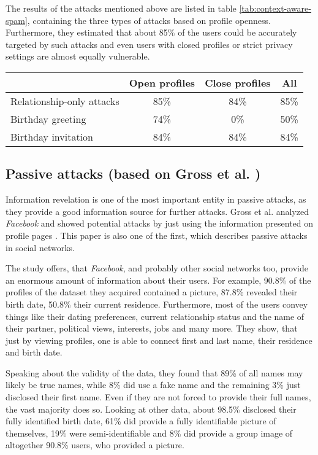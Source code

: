 The results of the attacks mentioned above are listed in table
\ref{tab:context-aware-spam}, containing the three types of attacks based on
profile openness. Furthermore, they estimated that about 85\% of the users
could be accurately targeted by such attacks and even users with closed
profiles or strict privacy settings are almost equally vulnerable.

\begin{table*}[ht]
  \centering
  \begin{tabular}{lccc}
    \toprule
    & Open profiles & Close profiles & All\\
    \midrule
    Relationship-only attacks & 85\% & 84\% & 85\% \\
    Birthday greeting         & 74\% &  0\% & 50\% \\
    Birthday invitation       & 84\% & 84\% & 84\% \\
    \bottomrule
  \end{tabular}
  \caption{Results of the case study of Brown et al. \cite{brown2008}}
  \label{tab:context-aware-spam}
\end{table*}

\subsection[Passive attacks]{Passive attacks (based on Gross et al. \cite{gross2005})}

Information revelation is one of the most important entity in passive attacks,
as they provide a good information source for further attacks. Gross et al.
analyzed \textit{Facebook} and showed potential attacks by just using the
information presented on profile pages \cite{gross2005}. This paper is also one
of the first, which describes passive attacks in social networks.

The study offers, that \textit{Facebook}, and probably other social networks
too, provide an enormous amount of information about their users. For example,
90.8\% of the profiles of the dataset they acquired contained a picture, 87.8\%
revealed their birth date, 50.8\% their current residence. Furthermore, most of
the users convey things like their dating preferences, current relationship
status and the name of their partner, political views, interests, jobs and many
more. They show, that just by viewing profiles, one is able to connect first
and last name, their residence and birth date.

Speaking about the validity of the data, they found that 89\% of all names may
likely be true names, while 8\% did use a fake name and the remaining 3\% just
disclosed their first name. Even if they are not forced to provide their full
names, the vast majority does so. Looking at other data, about 98.5\% disclosed
their fully identified birth date, 61\% did provide a fully identifiable
picture of themselves, 19\% were semi-identifiable and 8\% did provide a group
image of altogether 90.8\% users, who provided a picture.

